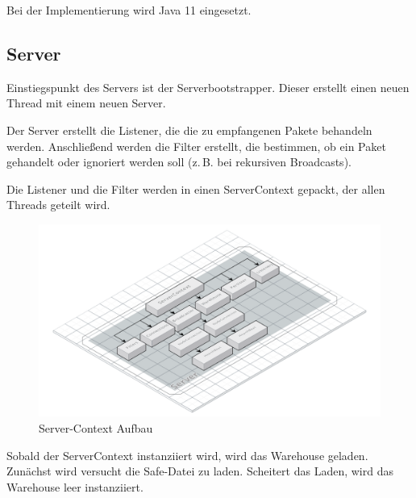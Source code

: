 
Bei der Implementierung wird Java 11 eingesetzt.
\subsection{Server}
Einstiegspunkt des Servers ist der Serverbootstrapper. Dieser erstellt einen neuen Thread mit einem neuen Server. 

Der Server erstellt die Listener, die die zu empfangenen Pakete behandeln werden. Anschließend werden die Filter erstellt, die bestimmen, ob ein Paket gehandelt oder ignoriert werden soll (z.\,B. bei rekursiven Broadcasts).


Die Listener und die Filter werden in einen ServerContext gepackt, der allen Threads geteilt wird.

\begin{figure}[h]
    \centering
    \includegraphics[width=\textwidth]{VS-Server-Context.png}
    
    \caption{Server-Context Aufbau}
\end{figure}

Sobald der ServerContext instanziiert wird, wird das Warehouse geladen. 
Zunächst wird versucht die Safe-Datei zu laden. Scheitert das Laden, wird das Warehouse leer instanziiert.


